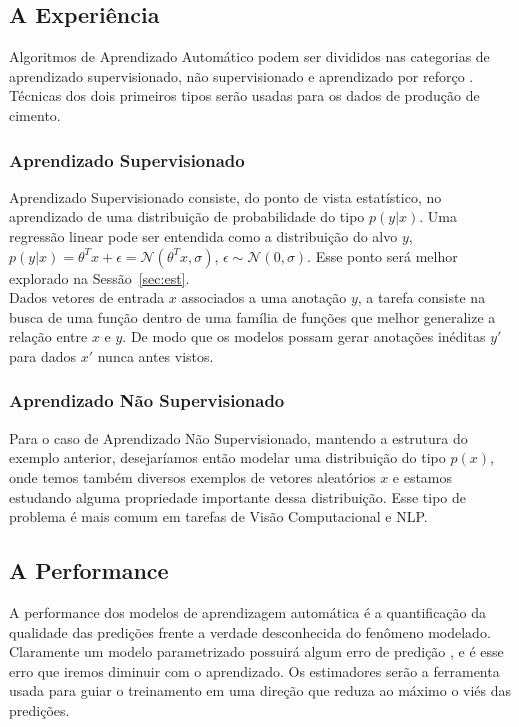 \subsection{A Experiência}
\label{sec:exp}
Algoritmos de Aprendizado Automático podem ser divididos nas categorias de
aprendizado supervisionado, não supervisionado e aprendizado por reforço
\citep{dlbook}. Técnicas dos dois primeiros tipos serão usadas para os dados de
produção de cimento.


\subsubsection{Aprendizado Supervisionado}
\label{sec:apren} 
Aprendizado Supervisionado consiste, do ponto de vista estatístico, no
aprendizado de uma distribuição de probabilidade do tipo $p(y | x)$. Uma
regressão linear pode ser entendida como a distribuição do alvo $y$, $p(y | x) = \theta^Tx + \epsilon =
\mathcal{N}(\theta^Tx,\sigma) $, $\epsilon \sim \mathcal{N}(0,\sigma)$. Esse ponto será melhor
explorado na Sessão~\ref{sec:est}. \\ 

Dados vetores de entrada $x$ associados a uma anotação $y$, a tarefa consiste na busca de uma
função dentro de uma família de funções que melhor generalize a relação entre
$x$ e $y$. De modo que os modelos possam gerar anotações inéditas $y'$ para
dados $x'$ nunca antes vistos. 


\subsubsection{Aprendizado Não Supervisionado}

Para o caso de Aprendizado Não Supervisionado, mantendo a estrutura do exemplo
anterior, desejaríamos então modelar uma distribuição do tipo $p(x)$, onde temos
também diversos exemplos de vetores aleatórios $x$ e estamos estudando alguma
propriedade importante dessa distribuição.
Esse tipo de problema é mais comum em tarefas de Visão Computacional e NLP.



\subsection{A Performance}
\label{sec:metricas}

A performance dos modelos de aprendizagem automática é a quantificação da
qualidade das predições frente a verdade desconhecida do fenômeno modelado.
Claramente um modelo parametrizado possuirá algum erro de predição \cite{dlbook}, e é esse
erro que iremos diminuir com o aprendizado. Os estimadores serão a ferramenta
usada para guiar o treinamento em uma direção que reduza ao máximo o viés das predições.

